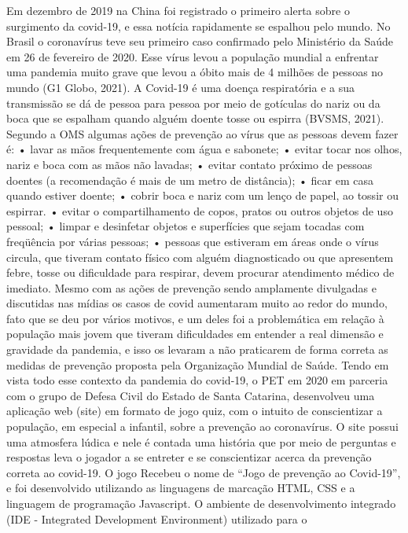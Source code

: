Em dezembro de 2019 na China foi registrado o primeiro alerta sobre o surgimento da
covid-19, e essa notícia rapidamente se espalhou pelo mundo. No Brasil o coronavírus teve seu 
primeiro caso confirmado pelo Ministério da Saúde em 26 de fevereiro de 2020. Esse vírus levou 
a população mundial a enfrentar uma pandemia muito grave que levou a óbito mais de 4 milhões 
de pessoas no mundo (G1 Globo, 2021).
A Covid-19 é uma doença respiratória e a sua transmissão se dá de pessoa para pessoa 
por meio de gotículas do nariz ou da boca que se espalham quando alguém doente tosse ou espirra 
(BVSMS, 2021). Segundo a OMS algumas ações de prevenção ao vírus que as pessoas devem 
fazer é: 
• lavar as mãos frequentemente com água e sabonete;
• evitar tocar nos olhos, nariz e boca com as mãos não lavadas;
• evitar contato próximo de pessoas doentes (a recomendação é mais de um metro de 
distância);
• ficar em casa quando estiver doente;
• cobrir boca e nariz com um lenço de papel, ao tossir ou espirrar. 
• evitar o compartilhamento de copos, pratos ou outros objetos de uso pessoal;
• limpar e desinfetar objetos e superfícies que sejam tocadas com freqüência por várias 
pessoas;
• pessoas que estiveram em áreas onde o vírus circula, que tiveram contato físico com 
alguém diagnosticado ou que apresentem febre, tosse ou dificuldade para respirar, devem 
procurar atendimento médico de imediato.
Mesmo com as ações de prevenção sendo amplamente divulgadas e discutidas nas mídias 
os casos de covid aumentaram muito ao redor do mundo, fato que se deu por vários motivos, e um 
deles foi a problemática em relação à população mais jovem que tiveram dificuldades em entender 
a real dimensão e gravidade da pandemia, e isso os levaram a não praticarem de forma correta as 
medidas de prevenção proposta pela Organização Mundial de Saúde. 
Tendo em vista todo esse contexto da pandemia do covid-19, o PET em 2020 em parceria 
com o grupo de Defesa Civil do Estado de Santa Catarina, desenvolveu uma aplicação web (site) 
em formato de jogo quiz, com o intuito de conscientizar a população, em especial a infantil, sobre 
a prevenção ao coronavírus. O site possui uma atmosfera lúdica e nele é contada uma história que 
por meio de perguntas e respostas leva o jogador a se entreter e se conscientizar acerca da 
prevenção correta ao covid-19.
O jogo Recebeu o nome de “Jogo de prevenção ao Covid-19”, e foi desenvolvido utilizando 
as linguagens de marcação HTML, CSS e a linguagem de programação Javascript. O ambiente de 
desenvolvimento integrado (IDE - Integrated Development Environment) utilizado para o 
